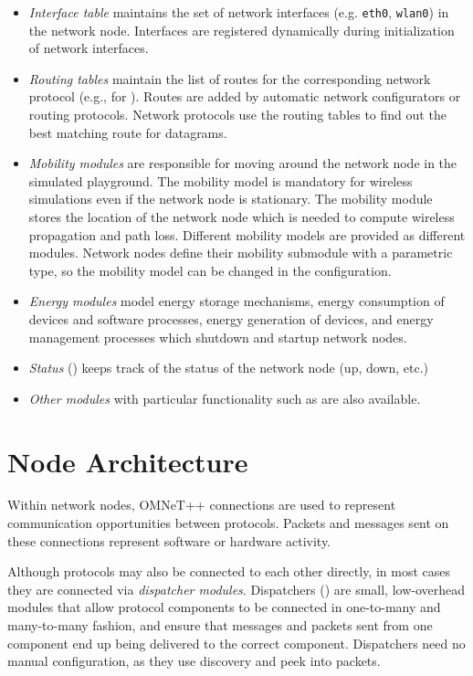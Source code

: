\begin{itemize}
  \item \textit{Interface table} maintains the set of network interfaces
     (e.g. \texttt{eth0}, \texttt{wlan0}) in the network node. Interfaces
     are registered dynamically during initialization of network interfaces.
  \item \textit{Routing tables} maintain the list of routes for the corresponding
     network protocol (e.g.,  for ).
     Routes are added by automatic network configurators or routing protocols.
     Network protocols use the routing tables to find out the best matching
     route for datagrams.
  \item \textit{Mobility modules} are responsible for moving around the network
     node in the simulated playground. The mobility model is mandatory for
     wireless simulations even if the network node is stationary. The mobility
     module stores the location of the network node which is needed to compute
     wireless propagation and path loss. Different mobility models are provided
     as different modules. Network nodes define their mobility submodule with
     a parametric type, so the mobility model can be changed in the configuration.
  \item \textit{Energy modules} model energy storage mechanisms, energy
     consumption of devices and software processes, energy generation of devices,
     and energy management processes which shutdown and startup network nodes.
  \item \textit{Status} () keeps track of the status of the
     network node (up, down, etc.)
  \item \textit{Other modules} with particular functionality such as
      are also available.
\end{itemize}

\section{Node Architecture}
\label{sec:nodes:node-architecture}

Within network nodes, OMNeT++ connections are used to represent
communication opportunities between protocols. Packets and
messages sent on these connections represent software or hardware activity.

Although protocols may also be connected to each other directly,
in most cases they are connected via \textit{dispatcher modules}.
Dispatchers () are small, low-overhead modules
that allow protocol components to be connected in one-to-many and many-to-many
fashion, and ensure that messages and packets sent from one component end up
being delivered to the correct component. Dispatchers need no manual
configuration, as they use discovery and peek into packets.

